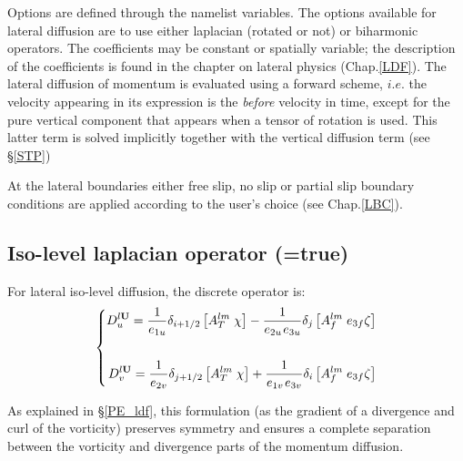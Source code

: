 Options are defined through the  namelist variables.
The options available for lateral diffusion are to use either laplacian 
(rotated or not) or biharmonic operators. The coefficients may be constant 
or spatially variable; the description of the coefficients is found in the chapter 
on lateral physics (Chap.\ref{LDF}). The lateral diffusion of momentum is 
evaluated using a forward scheme, $i.e.$ the velocity appearing in its expression 
is the \textit{before} velocity in time, except for the pure vertical component 
that appears when a tensor of rotation is used. This latter term is solved 
implicitly together with the vertical diffusion term (see \S\ref{STP}) 

At the lateral boundaries either free slip, no slip or partial slip boundary 
conditions are applied according to the user's choice (see Chap.\ref{LBC}).

\subsection   [Iso-level laplacian operator (\np{ln\_dynldf\_lap}) ]
			{Iso-level laplacian operator (=true)}
\label{DYN_ldf_lap}

For lateral iso-level diffusion, the discrete operator is: 
\begin{equation} \label{Eq_dynldf_lap}
\left\{ \begin{aligned}
 D_u^{l{\rm {\bf U}}} =\frac{1}{e_{1u} }\delta _{i+1/2} \left[ {A_T^{lm} 
\;\chi } \right]-\frac{1}{e_{2u} {\kern 1pt}e_{3u} }\delta _j \left[ 
{A_f^{lm} \;e_{3f} \zeta } \right] \\ 
\\
 D_v^{l{\rm {\bf U}}} =\frac{1}{e_{2v} }\delta _{j+1/2} \left[ {A_T^{lm} 
\;\chi } \right]+\frac{1}{e_{1v} {\kern 1pt}e_{3v} }\delta _i \left[ 
{A_f^{lm} \;e_{3f} \zeta } \right] \\ 
\end{aligned} \right.
\end{equation} 

As explained in \S\ref{PE_ldf}, this formulation (as the gradient of a divergence 
and curl of the vorticity) preserves symmetry and ensures a complete 
separation between the vorticity and divergence parts of the momentum diffusion. 

